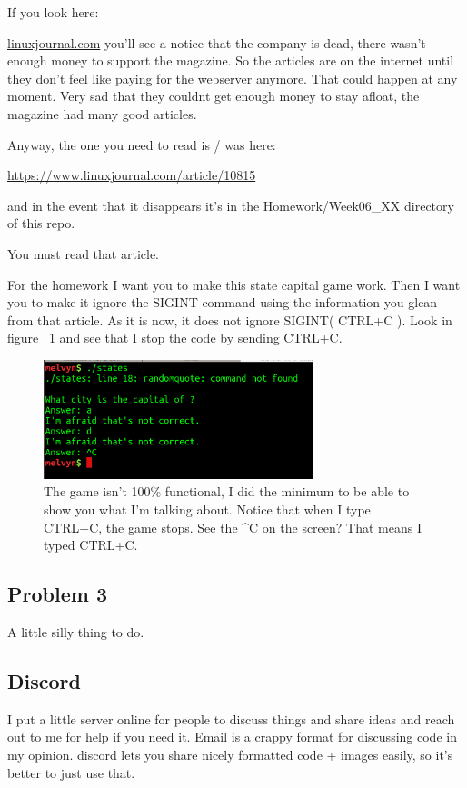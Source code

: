 \documentclass[8pt]{article}
\begin{document}
If you look here:

\url{linuxjournal.com} you'll see a notice that the company is dead, there
wasn't enough money to support the magazine. So the articles are on the internet
until they don't feel like paying for the webserver anymore. That could happen
at any moment. Very sad that they couldnt get enough money to stay afloat, the
magazine had many good articles. 

Anyway, the one you need to read is / was here:

\url{https://www.linuxjournal.com/article/10815} 

and in the event that it disappears it's in the Homework/Week06\_XX directory of
this repo.

You must read that article. 

For the homework I want you to make this state capital game work. Then I want
you to make it ignore the SIGINT command using the information you glean from
that article. As it is now, it does not ignore SIGINT( CTRL+C ). Look in figure
~\ref{fig:notIgnoring} and see that I stop the code by sending CTRL+C.

\begin{figure}[ht]
	\centering
	\includegraphics[width=0.7\textwidth]{Images/homework.png}
	\caption{The game isn't 100\% functional, I did the minimum to be able to
show you what I'm talking about. Notice that when I type CTRL+C, the game stops.
See the \^{}C on the screen? That means I typed CTRL+C.}
	\label{fig:notIgnoring}
\end{figure}

\subsection{Problem 3}
A little silly thing to do. 

\subsection{Discord}
I put a little server online for people to discuss things and share ideas and
reach out to me for help if you need it. Email is a crappy format for discussing
code in my opinion. discord lets you share nicely formatted code + images
easily, so it's better to just use that.
\end{document}
